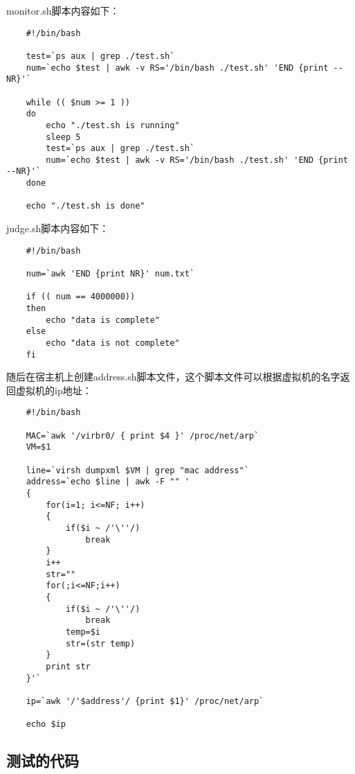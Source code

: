 \documentclass[a4paper,left=1.5cm,right=1.5cm,11pt]{article}
\begin{document}
	monitor.sh脚本内容如下：
	\begin{lstlisting}
	#!/bin/bash

	test=`ps aux | grep ./test.sh`
	num=`echo $test | awk -v RS='/bin/bash ./test.sh' 'END {print --NR}'`

	while (( $num >= 1 )) 
	do
		echo "./test.sh is running"
		sleep 5
		test=`ps aux | grep ./test.sh`
		num=`echo $test | awk -v RS='/bin/bash ./test.sh' 'END {print --NR}'`
	done

	echo "./test.sh is done"
	\end{lstlisting}

	judge.sh脚本内容如下：
	\begin{lstlisting}
	#!/bin/bash

	num=`awk 'END {print NR}' num.txt`

	if (( num == 4000000)) 
	then
		echo "data is complete"
	else
		echo "data is not complete"
	fi
	\end{lstlisting}

	随后在宿主机上创建address.sh脚本文件，这个脚本文件可以根据虚拟机的名字返回虚拟机的ip地址：
	\begin{lstlisting}
	#!/bin/bash

	MAC=`awk '/virbr0/ { print $4 }' /proc/net/arp`
	VM=$1

	line=`virsh dumpxml $VM | grep "mac address"`
	address=`echo $line | awk -F "" '
	{
		for(i=1; i<=NF; i++)
		{
			if($i ~ /'\''/)
				break
		}
		i++
		str=""
		for(;i<=NF;i++)
		{
			if($i ~ /'\''/)
				break
			temp=$i
			str=(str temp)
		}
		print str
	}'`

	ip=`awk '/'$address'/ {print $1}' /proc/net/arp`

	echo $ip
	\end{lstlisting}

\subsection{测试的代码}
\subsubsection{}
\end{document}
